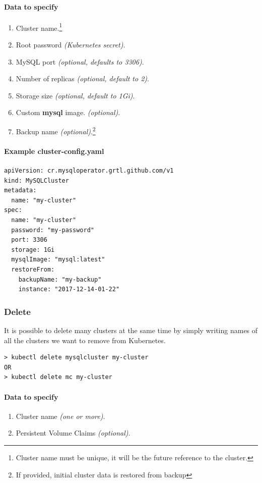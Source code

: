 \paragraph{Data to specify}
\begin{enumerate}
	\item Cluster name.\footnote{Cluster name must be unique, it will be the future reference
	to the cluster.}
	\item Root password \textit{(Kubernetes secret)}.
	\item MySQL port \textit{(optional, defaults to 3306)}.
	\item Number of replicas \textit{(optional, default to 2)}.
	\item Storage size \textit{(optional, default to 1Gi)}.
	\item Custom \textbf{mysql} image. \textit{(optional)}.
	\item Backup name \textit{(optional)}.\footnote{If provided, initial cluster data is restored
	from backup}
\end{enumerate}

\paragraph{Example \textbf{cluster-config.yaml}}
\begin{lstlisting}[caption=cluster-config.yaml,captionpos=b]
apiVersion: cr.mysqloperator.grtl.github.com/v1
kind: MySQLCluster
metadata:
  name: "my-cluster"
spec:
  name: "my-cluster"
  password: "my-password"
  port: 3306
  storage: 1Gi
  mysqlImage: "mysql:latest"
  restoreFrom: 
	backupName: "my-backup"
	instance: "2017-12-14-01-22"
\end{lstlisting}

\subsubsection*{Delete}

It is possible to delete many clusters at the same time by simply writing
names of all the clusters we want to remove from Kubernetes.

\begin{lstlisting}
> kubectl delete mysqlcluster my-cluster
OR
> kubectl delete mc my-cluster
\end{lstlisting}

\paragraph{Data to specify}
\begin{enumerate}
	\item Cluster name \textit{(one or more)}.
	\item Persistent Volume Claims \textit{(optional)}.
\end{enumerate}

